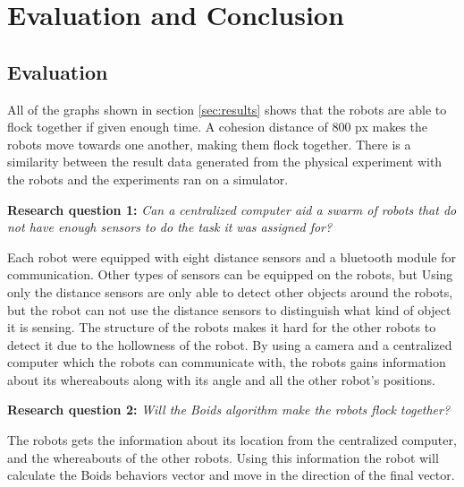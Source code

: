 \chapter{Evaluation and Conclusion}
\label{cha:evaluationAndConclusion}




\section{Evaluation}
\label{sec:Evaluation}
All of the graphs shown in section \ref{sec:results} shows that the robots are able to flock together if given enough time. A cohesion distance of 800 px makes the robots move towards one another, making them flock together. There is a similarity between the result data generated from the physical experiment with the robots and the experiments ran on a simulator.

\textbf{Research question 1:} {\it Can a centralized computer aid a swarm of robots that do not have enough sensors to do the task it was assigned for?}

Each robot were equipped with eight distance sensors and a bluetooth module for communication. Other types of sensors can be equipped on the robots, but 
Using only the distance sensors are only able to detect other objects around the robots, but the robot can not use the distance sensors to distinguish what kind of object it is sensing. The structure of the robots makes it hard for the other robots to detect it due to the hollowness of the robot. 
By using a camera and a centralized computer which the robots can communicate with, the robots gains information about its whereabouts along with its angle and all the other robot's positions. 

\textbf{Research question 2:} {\it Will the Boids algorithm make the robots flock together?}

The robots gets the information about its location from the centralized computer, and the whereabouts of the other robots. Using this information the robot will calculate the Boids behaviors vector and move in the direction of the final vector.

